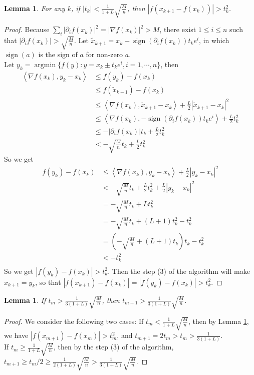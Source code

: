\documentclass[pdf]{article}
\DeclareMathOperator{\sign}{sign}
\DeclareMathOperator{\argmin}{argmin}
\newtheorem{lemma}[theorem]{Lemma}
\begin{document}
\begin{lemma}\label{Question5Lemma1}
For any $k$, if $|t_k| < \frac{1}{1+L}\sqrt{\frac{M}{n}}$, then $|f(x_{k+1} - f(x_k))| > t_k^2$.
\end{lemma}
\begin{proof}
Because $\sum\limits_i |\partial_i f(x_k)| ^2= |\nabla f(x_k)|^2 > M$, there exist $1\leq i\leq n$ such that $|\partial_i f(x_k)| > \sqrt{\frac{M}{n}}$. Let $\tilde{x}_{k+1} = x_k - \sign(\partial_i f(x_k))t_ke^i$, in which $\sign(a)$ is the sign of $a$ for non-zero $a$.\\ 

Let $y_k = \argmin\{f(y): y = x_k\pm t_ke^i, i = 1,\cdots, n\}$, then
\begin{align*}
\left<\nabla f(x_k), y_k - x_k\right> &\leq f(y_k) - f(x_{k}) \\
						   &\leq f(\tilde{x}_{k+1}) - f(x_{k}) \\
						   &\leq \left<\nabla f(x_k), \tilde{x}_{k+1} - x_k\right> + \frac{L}{2}|\tilde{x}_{k+1} - x_k|^2\\
						   &\leq \left<\nabla f(x_k), - \sign(\partial_i f(x_k))t_ke^i\right> + \frac{L}{2}t_k^2\\
						   &\leq -|\partial_i f(x_k)|t_k  + \frac{L}{2}t_k^2\\
						   &< -\sqrt{\frac{M}{n}}t_k  + \frac{L}{2}t_k^2
\end{align*}
So we get
\begin{align*}
f(y_k) - f(x_{k}) &\leq \left<\nabla f(x_k), y_k - x_k\right> +   \frac{L}{2}|y_k-x_k|^2\\
						   &< -\sqrt{\frac{M}{n}}t_k  + \frac{L}{2}t_k^2 + \frac{L}{2}|y_k-x_k|^2\\
						   &= -\sqrt{\frac{M}{n}}t_k  + Lt_k^2\\
						   &= -\sqrt{\frac{M}{n}}t_k  + (L+1)t_k^2 - t_k^2\\
						   &= (-\sqrt{\frac{M}{n}}  + (L+1)t_k)t_k - t_k^2\\
						   &< - t_k^2\\
\end{align*}
So we get $|f(y_k) - f(x_{k})| > t_k^2$. Then the step (3) of the algorithm will make $x_{k+1} = y_k$, so that $|f(x_{k+1}) - f(x_{k})| = |f(y_k) - f(x_{k})| > t_k^2$.
\end{proof}

\begin{lemma}\label{Question5Lemma2}
If $t_m > \frac{1}{3(1+L)}\sqrt{\frac{M}{n}}$, then $t_{m+1} > \frac{1}{3(1+L)}\sqrt{\frac{M}{n}}$.
\end{lemma}
\begin{proof} We consider the following two cases:
If $t_m< \frac{1}{1+L}\sqrt{\frac{M}{n}}$, then by Lemma \ref{Question5Lemma1}, we have $|f(x_{m+1}) - f(x_{m})|>t_m^2$, and $t_{m+1}=2t_m>t_m>\frac{1}{3(1+L)}$.\\
If $t_m\geq \frac{1}{1+L}\sqrt{\frac{M}{n}}$, then by the step (3) of the algorithm, $t_{m+1}\geq t_m/2 \geq \frac{1}{2(1+L)}\sqrt{\frac{M}{n}} > \frac{1}{3(1+L)}\sqrt{\frac{M}{n}}$.
\end{proof}
\end{document}

